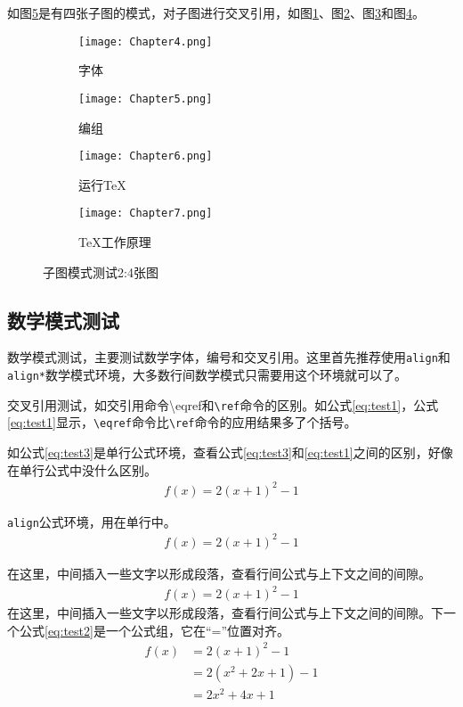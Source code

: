 如图\ref{fig:subfig_test2}是有四张子图的模式，对子图进行交叉引用，如图\ref{subfig:2a}、图\ref{subfig:2b}、图\ref{subfig:2c}和图\ref{subfig:2d}。

\begin{figure}[htbp]
	\centering
	\begin{subfigure}[b]{.4\textwidth}
		\centering
		\texttt{[image: Chapter4.png]}
		\caption{字体}\label{subfig:2a}
	\end{subfigure}
	\begin{subfigure}[b]{.4\textwidth}
		\centering
		\texttt{[image: Chapter5.png]}
		\caption{编组}\label{subfig:2b}
	\end{subfigure}
	\begin{subfigure}[b]{.4\textwidth}
		\centering
		\texttt{[image: Chapter6.png]}
		\caption{运行\TeX}\label{subfig:2c}
	\end{subfigure}
	\begin{subfigure}[b]{.4\textwidth}
		\centering
		\texttt{[image: Chapter7.png]}
		\caption{\TeX 工作原理}\label{subfig:2d}
	\end{subfigure}
	\caption{子图模式测试2:4张图}\label{fig:subfig_test2}
\end{figure}

\subsection{数学模式测试}
数学模式测试，主要测试数学字体，编号和交叉引用。这里首先推荐使用\texttt{align}和\texttt{align*}数学模式环境，大多数行间数学模式只需要用这个环境就可以了。

交叉引用测试，如交引用命令{\ttfamily \textbackslash eqref}和\texttt{\textbackslash ref}命令的区别。如公式\eqref{eq:test1}，公式\ref{eq:test1}显示，\texttt{\textbackslash eqref}命令比\texttt{\textbackslash ref}命令的应用结果多了个括号。

如公式\eqref{eq:test3}是单行公式环境，查看公式\eqref{eq:test3}和\eqref{eq:test1}之间的区别，好像在单行公式中没什么区别。
\begin{align}\label{eq:test3}
	f(x) = 2(x + 1)^{2} - 1
\end{align}

\texttt{align}公式环境，用在单行中。
\begin{align}\label{eq:test1}
	f(x) = 2(x + 1)^{2} - 1
\end{align}

在这里，中间插入一些文字以形成段落，查看行间公式与上下文之间的间隙。
\begin{align*}
	f(x) = 2(x + 1)^{2} - 1
\end{align*}
在这里，中间插入一些文字以形成段落，查看行间公式与上下文之间的间隙。下一个公式\eqref{eq:test2}是一个公式组，它在“=”位置对齐。
\begin{align}\label{eq:test2}
	f(x) & = 2(x + 1)^{2} - 1\\
		 & = 2(x^{2} + 2x +1)-1\\
		 & = 2x^{2} + 4x + 1
\end{align}

